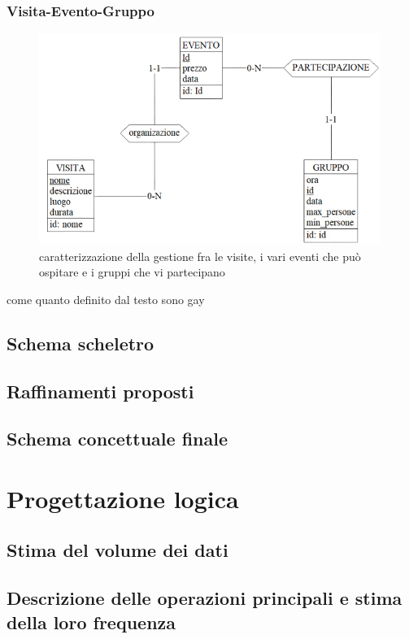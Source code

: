 \documentclass[a4paper,12pt]{report}
\begin{document}
\subsection*{Visita-Evento-Gruppo}
\begin{figure}[H]
	\centering
	\includegraphics[width=0.99\textwidth]{evento-visita-gruppo.png}
	\caption[]{caratterizzazione della gestione fra le visite, i vari eventi che può ospitare e i gruppi che vi partecipano}
\end{figure}
come quanto definito dal testo sono gay


\section{Schema scheletro}


\section{Raffinamenti proposti}
\section{Schema concettuale finale}

\newpage
\chapter{Progettazione logica}
\section{Stima del volume dei dati}
\section{Descrizione delle operazioni principali e stima della loro frequenza}
\end{document}
